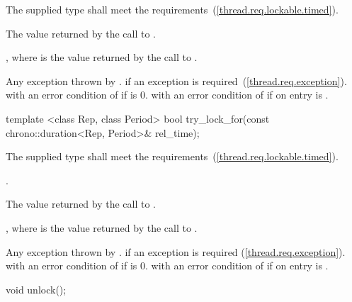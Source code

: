 \begin{itemdescr}
\pnum
\requires The supplied  type shall meet the 
requirements~(\ref{thread.req.lockable.timed}).

\pnum
\effects {}

\pnum
\returns The value returned by the call to .

\pnum
\postcondition {}, where  is the value returned by
the call to .

\pnum
\throws Any exception thrown by .  if an
exception is required~(\ref{thread.req.exception}).  with an error
condition of  if  is 0.  with an
error condition of  if on entry  is
.
\end{itemdescr}

%
%
\begin{itemdecl}
template <class Rep, class Period>
  bool try_lock_for(const chrono::duration<Rep, Period>& rel_time);
\end{itemdecl}

\begin{itemdescr}
\pnum
\requires The supplied  type shall meet the  requirements~(\ref{thread.req.lockable.timed}).

\pnum
\effects {}.

\pnum
\returns The value returned by the call to .

\pnum
\postcondition {}, where  is the value returned by the call to .

\pnum
\throws Any exception thrown by .  if an
exception is required (\ref{thread.req.exception}).  with an error
condition of  if  is 0.  with an
error condition of  if on entry  is
.
\end{itemdescr}

%
%
\begin{itemdecl}
void unlock();
\end{itemdecl}

